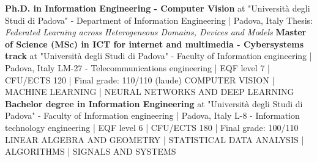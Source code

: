 
\begin{scholarship}
    {\textbf{Ph.D. in Information Engineering - Computer Vision}}
    \scholarshipentry{}
    {at "Università degli Studi di Padova" - Department of Information Engineering | Padova, Italy}
    \scholarshipentry{}
    {Thesis: \textit{Federated Learning across Heterogeneous Domains, Devices and Models}}
    {\textbf{Master of Science (MSc) in ICT for internet and multimedia - Cybersystems track}}
    \scholarshipentry{}
    {at "Università degli Studi di Padova" - Faculty of Information engineering | Padova, Italy}
    \scholarshipentry{}
    {LM-27 - Telecommunications engineering | EQF level 7 | CFU/ECTS 120 | Final grade: 110/110 (laude)}
    \scholarshipentry{}
    {COMPUTER VISION | MACHINE LEARNING | NEURAL NETWORKS AND DEEP LEARNING
    }
    {\textbf{Bachelor degree in Information Engineering} }
    \scholarshipentry{}
    {at "Università degli Studi di Padova" - Faculty of Information engineering | Padova, Italy}
    \scholarshipentry{}
    {L-8 - Information technology engineering | EQF level 6 | CFU/ECTS 180 | Final grade: 100/110}
    \scholarshipentry{}
    {LINEAR ALGEBRA AND GEOMETRY | STATISTICAL DATA ANALYSIS | ALGORITHMS | SIGNALS AND SYSTEMS
    }

\end{scholarship}
